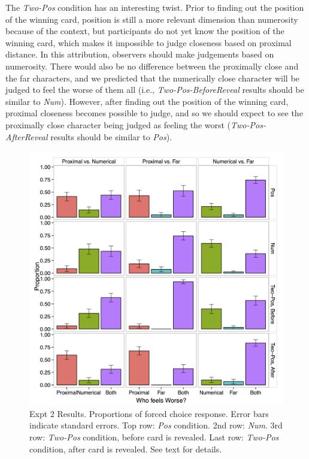 \documentclass[10pt,letterpaper]{article}
\begin{document}
The \textit{Two-Pos} condition has an interesting twist. Prior to finding out the position of the winning card, position is still a more relevant dimension than numerosity because of the context, but participants do not yet know the position of the winning card, which makes it impossible to judge closeness based on proximal distance. In this attribution, observers should make judgements based on numerosity. There would also be no difference between the proximally close and the far characters, and we predicted that the numerically close character will be judged to feel the worse of them all (i.e., \textit{Two-Pos-BeforeReveal} results should be similar to \textit{Num}). However, after finding out the position of the winning card, proximal closeness becomes possible to judge, and so we should expect to see the proximally close character being judged as feeling the worst (\textit{Two-Pos-AfterReveal} results should be similar to \textit{Pos}).



\begin{figure}[htb!]
\includegraphics[width=\columnwidth]{images/cardCombined_forcedWorse.png}
\caption{ Expt 2 Results. Proportions of forced choice response. Error bars indicate standard errors. Top row: \textit{Pos} condition. 2nd row: \textit{Num}. 3rd row: \textit{Two-Pos} condition, before card is revealed. Last row: \textit{Two-Pos} condition, after card is revealed. See text for details.}
\label{Expt2ResultFig}
\end{figure}
\end{document}
